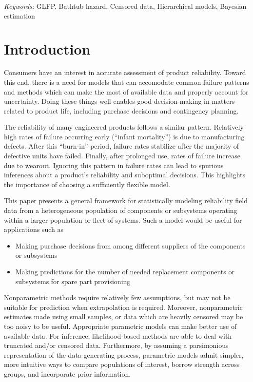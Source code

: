 \documentclass[12pt]{article}
\begin{document}

\noindent%
{\it Keywords:} GLFP, Bathtub hazard, Censored data, Hierarchical models, Bayesian estimation
\vfill

\newpage
{} %


\section{Introduction}
Consumers have an interest in accurate assessment of product reliability. Toward this end, there is a need for models that can accomodate common failure patterns and methods which can make the most of available data and properly account for uncertainty. Doing these things well enables good decision-making in matters related to product life, including purchase decisions and contingency planning.

The reliability of many engineered products follows a similar pattern. Relatively high rates of failure occurring early (``infant mortality'') is due to manufacturing defects.  After this ``burn-in'' period, failure rates stabilize after the majority of defective units have failed.  Finally, after prolonged use, rates of failure increase due to wearout.  Ignoring this pattern in failure rates can lead to spurious inferences about a product's reliability and suboptimal decisions. This highlights the importance of choosing a sufficiently flexible model.



This paper presents a general framework for statistically modeling reliability field data from a heterogeneous population of components or subsystems operating within a larger population or fleet of systems. Such a model would be useful for applications such as

\begin{itemize}
\item Making purchase decisions from among different suppliers of the components or subsystems
\item Making predictions for the number of needed replacement components or subsystems for spare part provisioning
\end{itemize}

Nonparametric methods require relatively few assumptions, but may not be suitable for prediction when extrapolation is required. Moreover, nonparametric estimates made using small samples, or data which are heavily censored may be too noisy to be useful. Appropriate parametric models can make better use of available data. For inference, likelihood-based methods are able to deal with truncated and/or censored data. Furthermore, by assuming a parsimonious representation of the data-generating process, parametric models admit simpler, more intuitive ways to compare populations of interest, borrow strength across groups, and incorporate prior information. 
\end{document}
